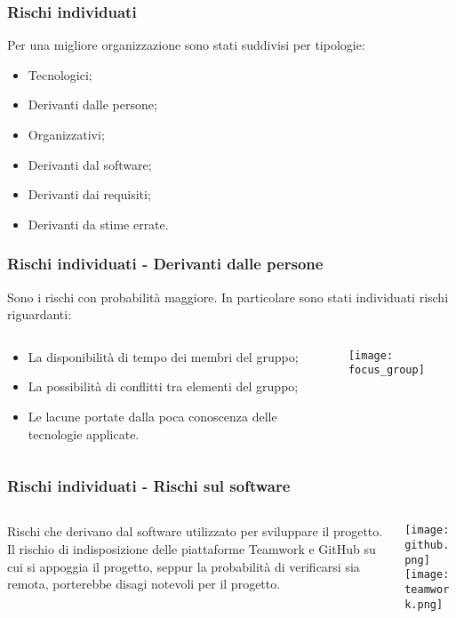 \begin{frame}
  \frametitle{Rischi individuati}
  Per una migliore organizzazione sono stati suddivisi per tipologie:
  \begin{itemize}
  \item Tecnologici;
  \item Derivanti dalle persone;
  \item Organizzativi;
  \item Derivanti dal software;
  \item Derivanti dai requisiti;
  \item Derivanti da stime errate.
  \end{itemize}
\end{frame}
  
\begin{frame}
    \frametitle{Rischi individuati - Derivanti dalle persone}

    Sono i rischi con probabilità maggiore. In particolare sono stati individuati rischi riguardanti:
    \begin{columns}
      \begin{column}{0.5\textwidth}
        \begin{itemize}
        \item La disponibilità di tempo dei membri del gruppo;
        \item La possibilità di conflitti tra elementi del gruppo;
        \item Le lacune portate dalla poca conoscenza delle tecnologie applicate.
        \end{itemize}
      \end{column}
      \begin{column}{0.5\textwidth}
        \texttt{[image: focus\_group]}
      \end{column}
    \end{columns}
\end{frame}

\begin{frame}
  \frametitle{Rischi individuati - Rischi sul software}
  \begin{columns}
    \begin{column}{0.5\textwidth}
  Rischi che derivano dal software utilizzato per sviluppare il progetto.\\
  Il rischio di indisposizione delle piattaforme Teamwork e GitHub su cui si appoggia il progetto, seppur la probabilità di verificarsi sia remota, porterebbe disagi notevoli per il progetto.
    \end{column}
    \begin{column}{0.5\textwidth}
      \texttt{[image: github.png]}\\
      \texttt{[image: teamwork.png]}
    \end{column}
  \end{columns}
\end{frame}

